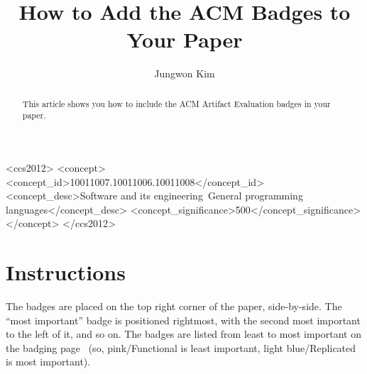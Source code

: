 \documentclass[sigplan]{acmart}
\begin{document}
\title{How to Add the ACM Badges to Your Paper}

\author{Jungwon Kim}

\begin{abstract}
This article shows you how to include the ACM Artifact Evaluation badges in your paper.
\end{abstract}

\begin{CCSXML}
<ccs2012>
<concept>
<concept_id>10011007.10011006.10011008</concept_id>
<concept_desc>Software and its engineering~General programming languages</concept_desc>
<concept_significance>500</concept_significance>
</concept>
</ccs2012>
\end{CCSXML}



\maketitle


\section{Instructions}
The badges are placed on the top right corner of the paper, side-by-side. The “most important” badge is positioned rightmost, with the second most important to the left of it, and so on. The badges are listed from least to most important on the badging page~\cite{ACM} (so, pink/Functional is least important, light blue/Replicated is most important).



\end{document}

